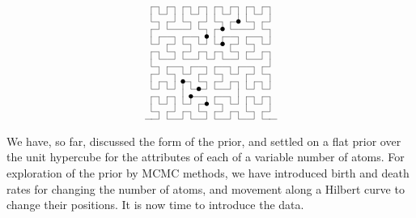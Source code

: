 $$
\hbox{
{\vrule height 0.3pt width 6pt depth 0pt} 
\hskip -4pt
\vbox{\lineskip = -0.4pt \baselineskip = 0pt
      \hbox{\zd\od\zd\od\zd\od\zd\od\zd\od\zd\od\zd\od\zd\od}
      \hbox{\id\ld\id\id\id\ld\id\id\id\ld\id\id\id\ld\id\id}
      \hbox{\ld\od\zd\id\ld\od\zd\id\ld\od\zd\id\ld\od\zd\id}
      \hbox{\zd\id\ld\zd\zd\id\ld\od\zd\id\ld\zd\zd\id\ld\od}
      \hbox{\id\zd\zd\od\zd\zd\od\id\id\zd\zd\od\zd\zd\od\id}
      \hbox{\ld\id\zd\id\ld\od\ld\id\ld\id\zd\id\ld\od\ld\id}
      \hbox{\zd\od\ld\od\zd\id\zd\od\zd\od\ld\od\zd\id\zd\od}
      \hbox{\id\ld\zd\id\ld\zd\id\ld\id\ld\zd\id\ld\zd\id\id}
      \hbox{\ld\od\zd\zd\od\zd\zd\od\zd\zd\od\zd\zd\od\zd\id}
      \hbox{\zd\id\ld\od\ld\id\zd\id\ld\od\ld\id\zd\id\ld\od}
      \hbox{\id\zd\od\id\zd\od\ld\od\zd\id\zd\od\id\zd\od\id}
      \hbox{\ld\id\ld\id\id\ld\zd\id\ld\zd\id\id\ld\id\ld\id}
      \hbox{\zd\od\zd\od\id\zd\zd\od\zd\zd\od\id\zd\od\zd\od}
      \hbox{\id\ld\id\id\ld\id\zd\id\ld\od\ld\id\id\ld\id\id}
      \hbox{\ld\od\zd\id\zd\od\ld\od\zd\id\zd\od\ld\od\zd\id}
      \hbox{\zd\id\ld\zd\id\ld\zd\id\ld\zd\id\ld\zd\id\ld\od}
     }
\hskip -11pt {\vrule height 0.3pt width 7pt depth 0pt}
\hskip -117pt
\lower 2pt\vbox{\lineskip = -0.4pt \baselineskip = 0pt
      \hbox{\oo\oo\oo\oo\oo\oo\oo\oo\oo\oo\oo\oo\oo\oo\oo\oo}
      \hbox{\oo}
      \hbox{\oo\oo\oo\oo\oo\oo\oo\oo\oo\oo\oo $\bullet$}
      \hbox{\oo\oo\oo\oo\oo\oo\oo\oo\oo $\bullet$}
      \hbox{\oo\oo\oo\oo\oo\oo\oo $\bullet$}
      \hbox{\oo\oo\oo\oo\oo\oo\oo\oo\oo $\bullet$}
      \hbox{\oo}
      \hbox{\oo}
      \hbox{\oo}
      \hbox{\oo}
      \hbox{\oo\oo\oo\oo $\bullet$}
      \hbox{\oo\oo\oo\oo\oo\oo $\bullet$}
      \hbox{\oo\oo\oo\oo\oo $\bullet$}
      \hbox{\oo\oo\oo\oo\oo\oo\oo $\bullet$}
      \hbox{\oo}
      \hbox{\oo}
     }
     }
$$

\bigskip
{}
\smallskip

We have, so far, discussed the form of the prior, 
and settled on a flat prior over the unit hypercube for the attributes of each of a variable number of atoms.
For exploration of the prior by MCMC methods, we have introduced birth and death rates for changing the number of atoms,
and movement along a Hilbert curve to change their positions.
It is now time to introduce the data.


